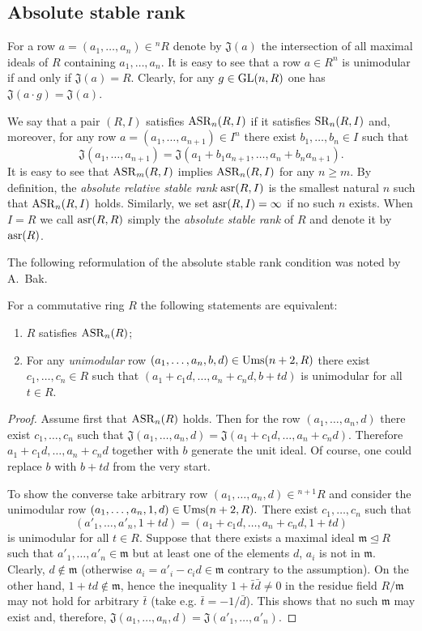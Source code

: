 \subsection{Absolute stable rank}
For a row $a=(a_1,\ldots,a_n)\in{}^n\!R$ denote by $\mathfrak{J}(a)$ the intersection of all maximal ideals of $R$ containing $a_1,\ldots,a_n$.
It is easy to see that a row $a\in R^n$ is unimodular if and only if $\mathfrak{J}(a)=R$. 
Clearly, for any $g\in\operatorname{GL}(n,R)$ one has $\mathfrak{J}(a\cdot g)=\mathfrak{J}(a)$.
\begin{dfn}
We say that a pair $(R,I)$ satisfies $\operatorname{ASR}_n(R,I)$ if it satisfies $\operatorname{SR}_n(R,I)$ and, moreover, 
for any row $a=(a_1,\ldots,a_{n+1})\in I^n$ there exist $b_1,\ldots,b_n\in I$ such that
\[\mathfrak{J}(a_1,\ldots,a_{n+1})=\mathfrak{J}(a_1+b_1a_{n+1},\ldots,a_n+b_na_{n+1}).\]
It is easy to see that $\operatorname{ASR}_m(R,I)$ implies $\operatorname{ASR}_n(R,I)$ for any $n\geqslant m$. 
By definition, the \emph{absolute relative stable rank} $\operatorname{asr}(R,I)$ is the smallest natural $n$ such that $\operatorname{ASR}_n(R, I)$ holds. 
Similarly, we set $\operatorname{asr}(R,I)=\infty$ if no such $n$ exists.
When $I=R$ we call $\operatorname{asr}(R, R)$ simply the \emph{absolute stable rank} of $R$ and denote it by $\operatorname{asr}(R)$.
\end{dfn}
The following reformulation of the absolute stable rank condition was noted by A.~Bak.
\begin{lemma} For a commutative ring $R$ the following statements are equivalent:
\begin{enumerate}
 \item\label{asr_Stein} $R$ satisfies $\operatorname{ASR}_n(R)$;
 \item\label{asr_Bak} For any \emph{unimodular} row $(a_1,\ldots,a_n,b,d)\in\operatorname{Ums}(n+2,R)$ there exist $c_1,\ldots,c_n\in R$ such that $(a_1+c_1d,\ldots,a_n+c_nd,b+td)$ is unimodular for all $t\in R$.
\end{enumerate}
\end{lemma}
\begin{proof}
Assume first that $\operatorname{ASR}_n(R)$ holds.
Then for the row $(a_1,\ldots,a_n,d)$ there exist $c_1,\ldots,c_n$ such that $\mathfrak{J}(a_1,\ldots,a_n,d)=\mathfrak{J}(a_1+c_1d,\ldots,a_n+c_nd)$. 
Therefore $a_1+c_1d,\ldots,a_n+c_nd$ together with $b$ generate the unit ideal.
Of course, one could replace $b$ with $b+td$ from the very start.

To show the converse take arbitrary row $(a_1,\ldots,a_n,d)\in{}^{n+1}\!R$ and consider the unimodular row $(a_1,\ldots,a_n,1,d)\in\operatorname{Ums}(n+2,R).$
There exist $c_1,\ldots,c_n$ such that \[(a'_1,\ldots,a'_n,1+td)=(a_1+c_1d,\ldots,a_n+c_nd,1+td)\] is unimodular for all $t\in R$.
Suppose that there exists a maximal ideal $\mathfrak{m}\trianglelefteq R$ such that $a'_1,\ldots,a'_n\in\mathfrak{m}$ but at least one of the elements $d$, $a_i$ is not in $\mathfrak{m}$.
Clearly, $d\notin\mathfrak{m}$ (otherwise $a_i=a'_i-c_id\in\mathfrak{m}$ contrary to the assumption).
On the other hand, $1+td\notin\mathfrak{m}$,
hence the inequality $1+\bar{t}\bar{d}\neq0$ in the residue field $R/\mathfrak{m}$ may not hold for arbitrary $\bar{t}$ 
(take e.g. $\bar{t}=-1/\bar{d}$).
This shows that no such $\mathfrak{m}$ may exist and, therefore, $\mathfrak{J}(a_1,\ldots,a_n,d)=\mathfrak{J}(a'_1,\ldots,a'_n)$.
\end{proof}

